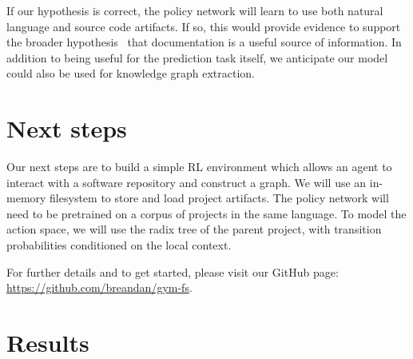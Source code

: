\documentclass[11pt]{article}
\begin{document}
If our hypothesis is correct, the policy network will learn to use both natural language and source code artifacts. If so, this would provide evidence to support the broader hypothesis~\cite{guo2017semantically} that documentation is a useful source of information. In addition to being useful for the prediction task itself, we anticipate our model could also be used for knowledge graph extraction.


\section{Next steps}

Our next steps are to build a simple RL environment which allows an agent to interact with a software repository and construct a graph. We will use an in-memory filesystem to store and load project artifacts. The policy network will need to be pretrained on a corpus of projects in the same language. To model the action space, we will use the radix tree of the parent project, with transition probabilities conditioned on the local context.

For further details and to get started, please visit our GitHub page: \url{https://github.com/breandan/gym-fs}.

\section{Results}
\end{document}
